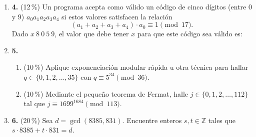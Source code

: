 \documentclass[11pt]{article}
\newcommand{\resp}{\underline{\hspace{3cm}}}
\begin{document}
\begin{enumerate}
\item[]\textbf{4.} (12\,\%) Un programa acepta como válido un código de cinco dígitos (entre $0$ y $9$) $a_0 a_1 a_2 a_3 a_4$ si estos valores satisfacen la relación
\[
(a_1 + a_2 + a_3 + a_4) \cdot a_0 \equiv 1 \pmod{17}.
\]
Dado $x\ 8\ 0\ 5\ 9$, el valor que debe tener $x$ para que este código sea válido es: \resp

\item[]\textbf{5.}
\begin{enumerate}[label=(\alph*)]
\item (10\,\%) Aplique exponenciación modular rápida u otra técnica para hallar $q \in \{0, 1, 2, \dots, 35\}$ con $q \equiv 5^{34} \pmod{36}$.
\item (10\,\%) Mediante el pequeño teorema de Fermat, halle $j \in \{0, 1, 2, \dots, 112\}$ tal que $j \equiv 1699^{1684} \pmod{113}$.
\end{enumerate}

\item[]\textbf{6.} (20\,\%) Sea $d = \gcd(8385, 831)$. Encuentre enteros $s, t \in \mathbb{Z}$ tales que $s \cdot 8385 + t \cdot 831 = d$.
\end{enumerate}

\vfill
{}
\end{document}
